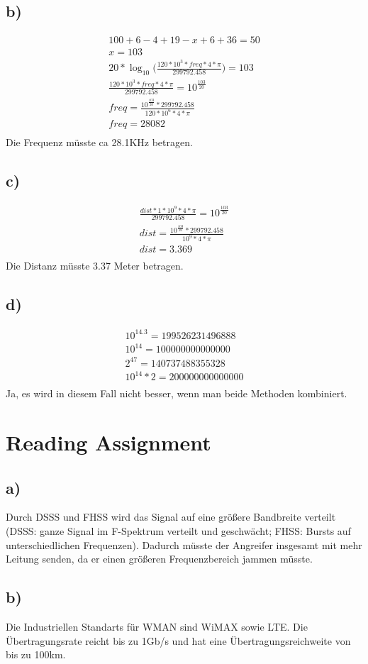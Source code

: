 \documentclass[12pt,a4paper]{article}
\begin{document}
\subsection*{b)}
\begin{eqnarray*}
100+6-4+19-x+6+36 = 50 \\
x = 103 \\
20*\log_{10}{(\frac{120*10^3*freq*4*\pi}{299792.458}}) = 103 \\
\frac{120*10^3*freq*4*\pi}{299792.458} = 10^{\frac{103}{20}} \\
freq = \frac{10^{\frac{103}{20}} * 299792.458}{120*10^6*4*\pi} \\
freq = 28082\\
\end{eqnarray*}
Die Frequenz müsste ca 28.1KHz betragen.
\subsection*{c)}
\begin{eqnarray*}
\frac{dist*1*10^9*4*\pi}{299792.458} = 10^{\frac{103}{20}} \\
dist = \frac{10^{\frac{103}{20}} * 299792.458}{10^9*4*\pi} \\
dist = 3.369\\
\end{eqnarray*}
Die Distanz müsste 3.37 Meter betragen.
\subsection*{d)}
\begin{eqnarray*}
10^{14.3} = 199526231496888 \\
10^{14} = 100000000000000 \\
2^{47} = 140737488355328 \\
10^{14}*2 = 200000000000000 \\
\end{eqnarray*}
Ja, es wird in diesem Fall nicht besser, wenn man beide Methoden kombiniert.
\section{Reading Assignment}
\subsection*{a)}
Durch DSSS und FHSS wird das Signal auf eine größere Bandbreite verteilt (DSSS: ganze Signal im F-Spektrum verteilt und geschwächt; FHSS: Bursts auf unterschiedlichen Frequenzen). Dadurch müsste der Angreifer insgesamt mit mehr Leitung senden, da er einen größeren Frequenzbereich jammen müsste.
\subsection*{b)}
Die Industriellen Standarts für WMAN sind WiMAX sowie LTE. Die Übertragungsrate reicht bis zu 1Gb/s und hat eine Übertragungsreichweite von bis zu 100km.
\end{document}
